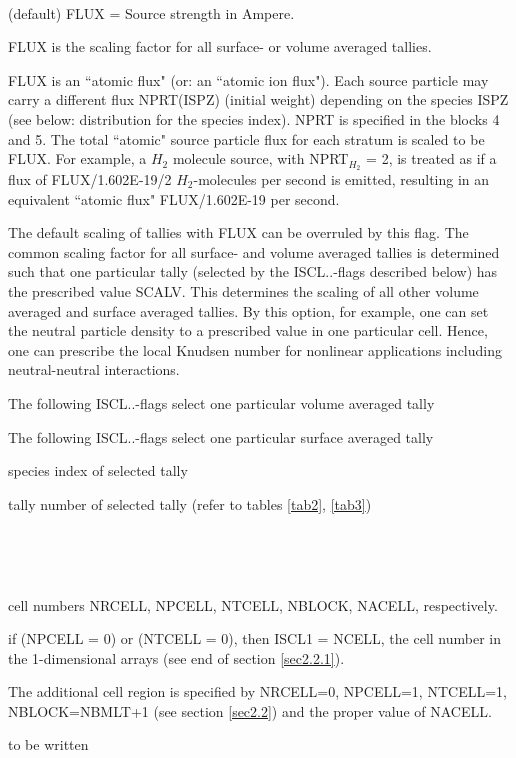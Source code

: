 \begin{list}{ }{}
\item[{\bf FLUX, SCALV}]~

\begin{list}{ }{}
\item[{SCALV=0}]
(default) FLUX = Source strength in Ampere.

FLUX is the scaling factor for all surface- or volume averaged
tallies.

FLUX is an ``atomic flux" (or: an ``atomic ion flux"). Each source
particle may carry a different flux NPRT(ISPZ) (initial weight)
depending on the species ISPZ (see below: distribution for the
species index). NPRT is specified in the blocks 4 and 5. The total
``atomic" source particle flux for each stratum is scaled to be
FLUX. For example, a $H_2$ molecule source, with NPRT$_{H_2}$ = 2,
is treated as if a flux of FLUX/1.602E-19/2 $H_2$-molecules per
second is emitted, resulting in an equivalent ``atomic flux"
FLUX/1.602E-19 per second. \item[{SCALV$\ne$0}] The default
scaling of tallies with FLUX can be overruled by this flag. The
common scaling factor for all surface- and volume averaged tallies
is determined such that one particular tally (selected by the
ISCL..-flags described below) has the prescribed value SCALV. This
determines the scaling of all other volume averaged and surface
averaged tallies. By this option, for example, one can set the
neutral particle density to a prescribed value in one particular
cell. Hence, one can prescribe the local Knudsen number for
nonlinear applications including neutral-neutral interactions.
 \end{list}
\item[{\bf IVLSF}]
\begin{list}{ }{}
\item[{=1}]
The following ISCL..-flags select one particular volume averaged tally
\item[{=2}]
The following ISCL..-flags select one particular surface averaged
tally
\end{list}
\item[{\bf ISCLS}]
species index of selected tally
\item[{\bf ISCLT}]
tally number of selected tally (refer to tables \ref{tab2}, \ref{tab3})
\item[{\bf ISCL1, ISCL2, ISCL3, ISCLB, ISCLA}]~

\begin{list}{ }{}
\item[{IVLSF=1}]~

cell numbers NRCELL, NPCELL, NTCELL, NBLOCK, NACELL, respectively.

if (NPCELL = 0) or (NTCELL = 0), then ISCL1 = NCELL, the cell number in the
1-dimensional arrays (see end of section \ref{sec2.2.1}).

The additional cell region is specified by NRCELL=0, NPCELL=1, NTCELL=1,
NBLOCK=NBMLT+1 (see section \ref{sec2.2}) and
the proper value of NACELL.
\item[{IVLSF=2}]
to be written
\end{list}
\end{list}

